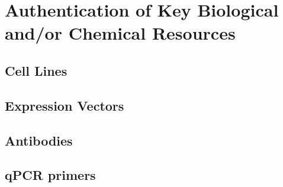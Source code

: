 
\section{Authentication of Key Biological and/or Chemical Resources}
\subsection{Cell Lines}
\lipsum[1-2]
\subsection{Expression Vectors}
\lipsum[3-3]
\subsection{Antibodies}
\lipsum[4-4]
\subsection{qPCR primers}
\lipsum[5-5]
